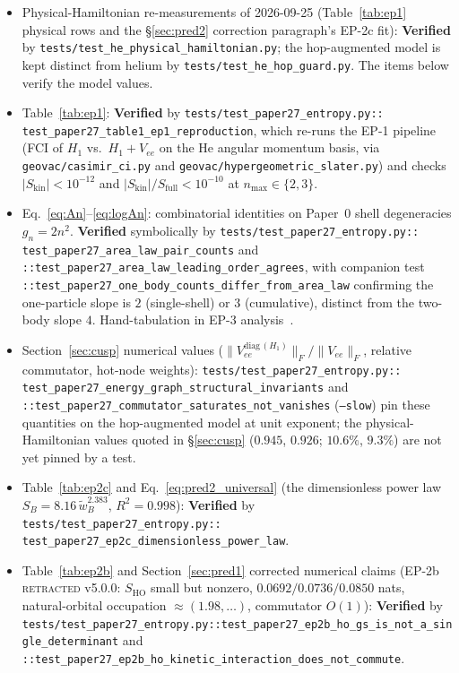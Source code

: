 \documentclass[twocolumn,pra,amsmath,amssymb,superscriptaddress]{revtex4-2}
\begin{document}
\begin{itemize}
  \item Physical-Hamiltonian re-measurements of 2026-09-25 (Table~\ref{tab:ep1}
    physical rows and the \S\ref{sec:pred2} correction paragraph's EP-2c fit):
    \textbf{Verified} by \texttt{tests/test\_he\_physical\_hamiltonian.py};
    the hop-augmented model is kept distinct from helium by
    \texttt{tests/test\_he\_hop\_guard.py}.  The items below verify the
    model values.
  \item Table~\ref{tab:ep1}:
    \textbf{Verified} by
    \texttt{tests/test\_paper27\_entropy.py::\allowbreak
    test\_paper27\_table1\_ep1\_reproduction}, which re-runs the
    EP-1 pipeline (FCI of $H_1$ vs.\ $H_1+V_{ee}$ on the He
    angular momentum basis, via \texttt{geovac/casimir\_ci.py}
    and \texttt{geovac/hypergeometric\_slater.py}) and checks
    $|S_{\mathrm{kin}}|<10^{-12}$ and
    $|S_{\mathrm{kin}}|/S_{\mathrm{full}}<10^{-10}$ at
    $n_{\max}\in\{2,3\}$.
  \item Eq.~\eqref{eq:An}--\eqref{eq:logAn}: combinatorial
    identities on Paper~0 shell degeneracies $g_n=2n^{2}$.
    \textbf{Verified} symbolically by
    \texttt{tests/test\_paper27\_entropy.py::\allowbreak
    test\_paper27\_area\_law\_pair\_counts} and
    \texttt{::test\_paper27\_area\_law\_leading\_order\_agrees},
    with companion test
    \texttt{::test\_paper27\_one\_body\_counts\_differ\_from\_area\_law}
    confirming the one-particle slope is $2$ (single-shell) or
    $3$ (cumulative), distinct from the two-body slope $4$.
    Hand-tabulation in EP-3 analysis~\cite{EP3_data}.
  \item Section~\ref{sec:cusp} numerical values
    ($\lVert V_{ee}^{\mathrm{diag}\,(H_1)}\rVert_F/\lVert V_{ee}\rVert_F$,
    relative commutator, hot-node weights):
    \texttt{tests/test\_paper27\_entropy.py::\allowbreak
    test\_paper27\_energy\_graph\_structural\_invariants} and
    \texttt{::test\_paper27\_commutator\_saturates\_not\_vanishes}
    (\texttt{--slow}) pin these quantities on the hop-augmented
    model at unit exponent; the physical-Hamiltonian values quoted in
    \S\ref{sec:cusp} ($0.945$, $0.926$; $10.6\%$, $9.3\%$) are not yet
    pinned by a test.
  \item Table~\ref{tab:ep2c} and
    Eq.~\eqref{eq:pred2_universal} (the dimensionless power law
    $S_B = 8.16\,\tilde{w}_B^{2.383}$, $R^{2}=0.998$):
    \textbf{Verified} by
    \texttt{tests/test\_paper27\_entropy.py::\allowbreak
    test\_paper27\_ep2c\_dimensionless\_power\_law}.
  \item Table~\ref{tab:ep2b} and Section~\ref{sec:pred1} corrected numerical claims (EP-2b \textsc{retracted} v5.0.0: $S_{\mathrm{HO}}$ small but nonzero, $0.0692/0.0736/0.0850$ nats, natural-orbital occupation $\approx(1.98,\ldots)$, commutator $O(1)$): \textbf{Verified} by \texttt{tests/test\_paper27\_entropy.py::\allowbreak test\_paper27\_ep2b\_ho\_gs\_is\_not\_a\_single\_determinant} and \texttt{::test\_paper27\_ep2b\_ho\_kinetic\_interaction\_does\_not\_commute}.

\end{itemize}
\end{document}

